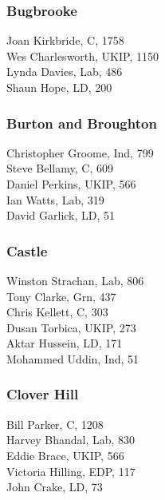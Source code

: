 \documentclass[a4paper,openany,10pt]{book}
\begin{document}
\subsubsection*{Bugbrooke}



Joan Kirkbride, C, 1758\\
Wes Charlesworth, UKIP, 1150\\
Lynda Davies, Lab, 486\\
Shaun Hope, LD, 200\\


\subsubsection*{Burton and Broughton}



Christopher Groome, Ind, 799\\
Steve Bellamy, C, 609\\
Daniel Perkins, UKIP, 566\\
Ian Watts, Lab, 319\\
David Garlick, LD, 51\\


\subsubsection*{Castle}



Winston Strachan, Lab, 806\\
Tony Clarke, Grn, 437\\
Chris Kellett, C, 303\\
Dusan Torbica, UKIP, 273\\
Aktar Hussein, LD, 171\\
Mohammed Uddin, Ind, 51\\


\subsubsection*{Clover Hill}



Bill Parker, C, 1208\\
Harvey Bhandal, Lab, 830\\
Eddie Brace, UKIP, 566\\
Victoria Hilling, EDP, 117\\
John Crake, LD, 73\\
\end{document}
